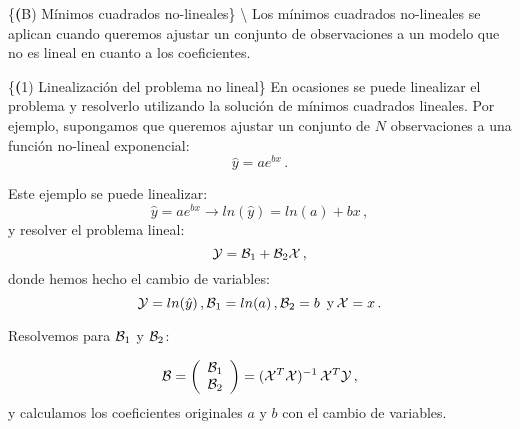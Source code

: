 \documentclass[
]{agujournal2019}
\begin{document}
\vspace{0.5cm} \{\noindent \textbf (B) \large Mínimos cuadrados
no-lineales\} \textbackslash{} \noindent Los mínimos cuadrados
no-lineales se aplican cuando queremos ajustar un conjunto de
observaciones a un modelo que no es lineal en cuanto a los coeficientes.

\vspace{0.5cm}

\{\noindent   \textbf  (1) Linealización del problema no lineal\} En
ocasiones se puede linealizar el problema y resolverlo utilizando la
solución de mínimos cuadrados lineales. Por ejemplo, supongamos que
queremos ajustar un conjunto de \(N\) observaciones a una función
no-lineal exponencial: \[\hat{y}=a e^{bx}\,.\]

Este ejemplo se puede linealizar:
\[\hat{y}=a e^{bx}\rightarrow ln(\hat{y})=ln(a) + bx\,,\] y resolver el
problema lineal: \[{\cal Y}={\cal B}_1 + {\cal B}_2 {\cal X}\,,\] donde
hemos hecho el cambio de variables:
\[{\cal Y}=ln(\hat{y})\,,{\cal B}_1=ln(a)\,,{\cal B}_2=b\,\,\,{\rm y}\,{\cal X}=x\,.\]

Resolvemos para \({\cal B}_1\) y \({\cal B}_2\):

\[{\cal B}=\left(\begin{array}{c}
            {\cal B}_1\\
            {\cal B}_2\\
              \end{array}\right)=({\cal X}^T {\cal X})^{-1}\,{\cal X}^T{\cal Y}
\,,\] y calculamos los coeficientes originales \(a\) y \(b\) con el
cambio de variables.

\vspace{0.5cm}
\end{document}
